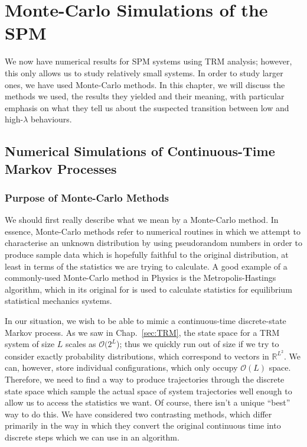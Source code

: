 \chapter{Monte-Carlo Simulations of the SPM} 
\label{sec:numerics}
We now have numerical results for SPM systems using TRM analysis; however, this only allows us to study
relatively small systems. In order to study larger ones, we have used Monte-Carlo methods. In this
chapter, we will discuss the methods we used, the results they yielded and their meaning, with 
particular emphasis on what they tell us about the suspected transition between low and high-$\lambda$
behaviours.
\section{Numerical Simulations of Continuous-Time Markov Processes}
\subsection{Purpose of Monte-Carlo Methods}
We should first really describe what we mean by a Monte-Carlo method. In essence, Monte-Carlo methods
refer to numerical routines in which we attempt to characterise an unknown distribution by using
pseudorandom numbers in order to produce sample data which is hopefully faithful to the original 
distribution, at least in terms of the statistics we are trying to calculate. A good example of a
commonly-used Monte-Carlo method in Physics is the Metropolis-Hastings algorithm, which in its original
for is used to calculate statistics for equilibrium statistical mechanics systems.

In our situation, we wish to be able to mimic a continuous-time discrete-state Markov process.
As we saw in Chap.~\ref{sec:TRM}, the state space for a TRM system of size $L$ scales as
$\mathcal{O}(2^L$); thus we quickly run out of size if we try to consider exactly probability distributions, which correspond to
vectors in $\mathbb{R}^{L^2}$. We can, however, store individual configurations, which only occupy
$\mathcal{O}(L)$ space. Therefore, we need to find a way to produce trajectories through the discrete
state space which sample the actual space of system trajectories well enough to allow us to access the
statistics we want. Of course, there isn't a unique ``best'' way to do this. We have considered two
contrasting methods, which differ primarily in the way in which they convert the original continuous 
time into discrete steps which we can use in an algorithm.

